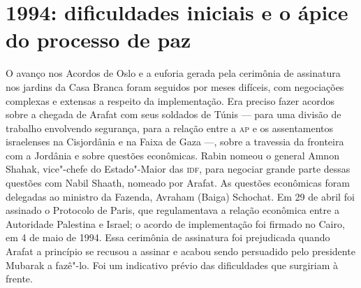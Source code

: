 \section{1994: dificuldades iniciais e o ápice do processo de paz}

O avanço nos Acordos de Oslo e a euforia gerada pela cerimônia de
assinatura nos jardins da Casa Branca foram seguidos por meses difíceis,
com negociações complexas e extensas a respeito da implementação. Era
preciso fazer acordos sobre a chegada de Arafat com seus soldados de
Túnis --- para uma divisão de trabalho envolvendo segurança, para a
relação entre a \textsc{ap} e os assentamentos israelenses na Cisjordânia e na
Faixa de Gaza ---, sobre a travessia da fronteira com a Jordânia e sobre
questões econômicas. Rabin nomeou o general Amnon Shahak, vice"-chefe do
Estado"-Maior das \textsc{idf}, para negociar grande parte dessas questões com
Nabil Shaath, nomeado por Arafat. As questões econômicas foram delegadas
ao ministro da Fazenda, Avraham (Baiga) Schochat. Em 29 de abril foi
assinado o Protocolo de Paris, que regulamentava a relação econômica
entre a Autoridade Palestina e Israel; o acordo de implementação foi
firmado no Cairo, em 4 de maio de 1994. Essa cerimônia de assinatura
foi prejudicada quando Arafat a princípio se recusou a assinar e acabou
sendo persuadido pelo presidente Mubarak a fazê"-lo. Foi um indicativo
prévio das dificuldades que surgiriam à frente.



